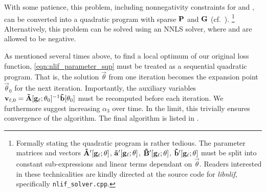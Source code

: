 With some patience, this problem, including nonnegativity constraints for \vrap and \mrAp, can be converted into a quadratic program with sparse $\mathbf{P}$ and $\mathbf{G}$ (cf.~).%
\footnote{
Formally stating the quadratic program is rather tedious.
The parameter matrices and vectors $\mathbf{\tilde A}'[\mathbf{g}_\ell; \mathbf{\theta}]$, $\mathbf{\tilde a}'[\mathbf{g}_\ell; \mathbf{\theta}]$, $\mathbf{\tilde B}'[\mathbf{g}_\ell; \mathbf{\theta}]$, $\mathbf{\tilde b}'[\mathbf{g}_\ell; \mathbf{\theta}]$ must be split into constant sub-expressions and linear terms dependant on $\vec \theta$.
Readers interested in these technicalities are kindly directed at the source code for \emph{libnlif}, specifically \texttt{nlif\_solver.cpp}.
}
Alternatively, this problem can be solved using an NNLS solver, where \vrbp and \mrBp are allowed to be negative.

As mentioned several times above, to find a local optimum of our original loss function, \cref{eqn:nlif_parameter_sqp} must be treated as a sequential quadratic program.
That is, the solution $\vec \theta$ from one iteration becomes the expansion point $\vec \theta_0$ for the next iteration.
Importantly, the auxiliary variables $\mathbf{v}_{\ell, 0} = \mathbf{\tilde A}[\mathbf{g}_\ell; \mathbf{\theta}_0]^{-1} \mathbf{\tilde b}[\mathbf{\theta}_0]$ must be recomputed before each iteration.
We furthermore suggest increasing $\alpha_3$ over time.
In the limit, this trivially ensures convergence of the algorithm.
The final algorithm is listed in .

